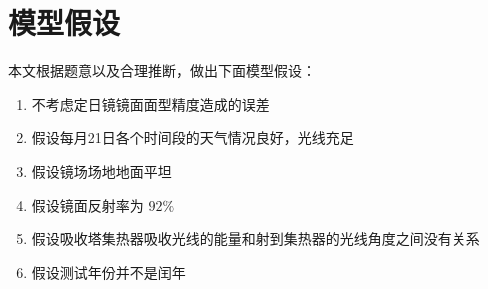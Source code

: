 \section{模型假设}
\noindent 本文根据题意以及合理推断，做出下面模型假设：
\begin{enumerate}
\item 不考虑定日镜镜面面型精度造成的误差
\item 假设每月21日各个时间段的天气情况良好，光线充足
\item 假设镜场场地地面平坦
\item 假设镜面反射率为 \(92\%\)
\item 假设吸收塔集热器吸收光线的能量和射到集热器的光线角度之间没有关系
\item 假设测试年份并不是闰年
\end{enumerate}
